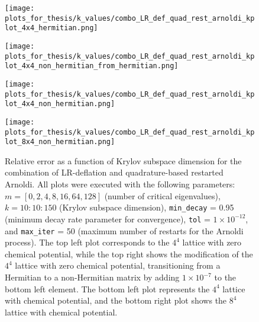 \begin{figure}[H]
    \centering
    \begin{minipage}{0.45\textwidth}
        \centering
        \texttt{[image: plots\_for\_thesis/k\_values/combo\_LR\_def\_quad\_rest\_arnoldi\_kplot\_4x4\_hermitian.png]} %
    \end{minipage}%
    \hspace{0.02\textwidth} %
    \begin{minipage}{0.45\textwidth}
        \centering
        \texttt{[image: plots\_for\_thesis/k\_values/combo\_LR\_def\_quad\_rest\_arnoldi\_kplot\_4x4\_non\_hermitian\_from\_hermitian.png]} %
    \end{minipage}
    
    \vspace{0.02\textwidth} %
    
    \begin{minipage}{0.45\textwidth}
        \centering
        \texttt{[image: plots\_for\_thesis/k\_values/combo\_LR\_def\_quad\_rest\_arnoldi\_kplot\_4x4\_non\_hermitian.png]} %
    \end{minipage}%
    \hspace{0.02\textwidth} %
    \begin{minipage}{0.45\textwidth}
        \centering
        \texttt{[image: plots\_for\_thesis/k\_values/combo\_LR\_def\_quad\_rest\_arnoldi\_kplot\_8x4\_non\_hermitian.png]} %
    \end{minipage}
    
    \caption{\small Relative error as a function of Krylov subspace dimension for the combination of LR-deflation and quadrature-based restarted Arnoldi. All plots were executed with the following parameters: $m = [0, 2, 4, 8, 16, 64, 128]$ (number of critical eigenvalues), $k = 10:10:150$ (Krylov subspace dimension), \texttt{min\_decay} = 0.95 (minimum decay rate parameter for convergence), \texttt{tol} = $1 \times 10^{-12}$, and \texttt{max\_iter} = 50 (maximum number of restarts for the Arnoldi process). The top left plot corresponds to the $4^4$ lattice with zero chemical potential, while the top right shows the modification of the $4^4$ lattice with zero chemical potential, transitioning from a Hermitian to a non-Hermitian matrix by adding $1 \times 10^{-7}$ to the bottom left element. The bottom left plot represents the $4^4$ lattice with chemical potential, and the bottom right plot shows the $8^4$ lattice with chemical potential.}
    \label{fig:combo_LR+restarted_arnoldi_k_plot}
\end{figure}

